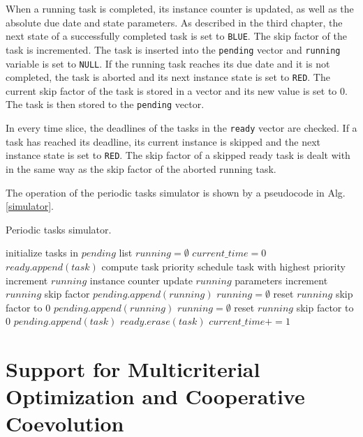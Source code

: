 When a running task is completed,
its instance counter is updated, as well as the absolute due date and state parameters.
As described in the third chapter, the next state of a successfully completed task is set to 
\texttt{BLUE}.
The skip factor of the task is incremented.
The task is inserted into the \texttt{pending} vector and \texttt{running} variable is set to \texttt{NULL}.
If the running task reaches its due date and it is not completed, the task is aborted and its next instance state is set to \texttt{RED}.
The current skip factor of the task is stored in a vector and its new value is set to $0$.
The task is then stored to the \texttt{pending} vector.

In every time slice, the deadlines of the tasks in the \texttt{ready} vector are checked.
If a task has reached its deadline, its current instance is skipped and the next instance state is set to \texttt{RED}.
The skip factor of a skipped ready task is dealt with in the same way as the skip factor of the aborted running task.

The operation of the periodic tasks simulator is shown by a pseudocode in Alg. \ref{simulator}.
\begin{algorithm}
\caption{Periodic tasks simulator.\label{simulator}}
\begin{algorithmic}[1]
\State initialize tasks in $pending$ list
\State $running = \emptyset$
\State $current\_time = 0$
			\State $ready.append(task)$
		\EndIf
	\EndFor
		\State compute task priority
	\EndFor
	\State schedule task with highest priority
			\State increment $running$ instance counter
			\State update $running$ parameters
			\State increment $running$ skip factor
			\State $pending.append(running)$
			\State $running = \emptyset$
		\Else 
				\State reset $running$ skip factor to $0$
				\State $pending.append(running)$
				\State $running = \emptyset$ 
			\EndIf
		\EndIf
	\EndIf
			\State reset $running$ skip factor to $0$
			\State $pending.append(task)$
			\State $ready.erase(task)$
		\EndIf
	\EndFor
	\State $current\_time+=1$
\EndWhile
\end{algorithmic}
\end{algorithm}

\section{Support for Multicriterial Optimization and Cooperative Coevolution}
